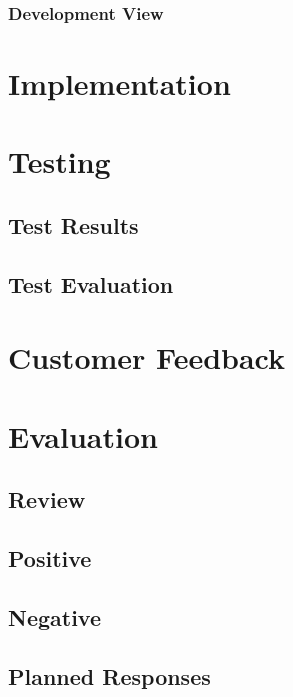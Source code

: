 \subsubsection{Development View}

\section{Implementation}

\section{Testing}
\subsection{Test Results}
\subsection{Test Evaluation}

\section{Customer Feedback}

\section{Evaluation}
\subsection{Review}
\subsection{Positive}
\subsection{Negative}
\subsection{Planned Responses}
